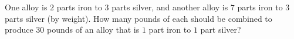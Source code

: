 One alloy is $2$ parts iron to $3$ parts silver, and another alloy is $7$ parts iron to $3$ parts silver (by weight). How many pounds of each should be combined to produce $30$ pounds of an alloy that is $1$ part iron to $1$ part silver?
